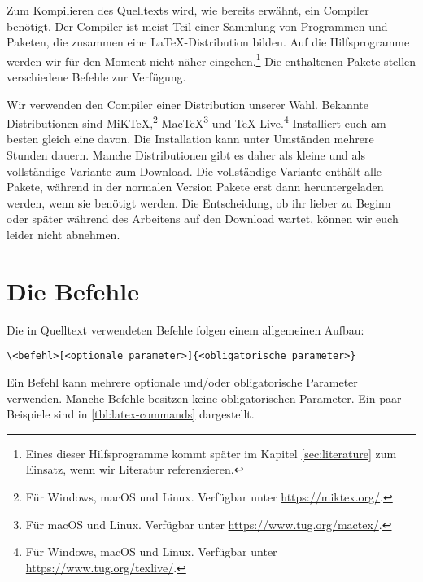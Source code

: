 Zum Kompilieren des Quelltexts wird, wie bereits erwähnt, ein Compiler benötigt.
Der Compiler ist meist Teil einer Sammlung von Programmen und Paketen, die zusammen eine \LaTeX-Distribution bilden. 
Auf die Hilfsprogramme werden wir für den Moment nicht näher eingehen.\footnote{Eines dieser Hilfsprogramme kommt später im Kapitel \ref{sec:literature} zum Einsatz, wenn wir Literatur referenzieren.} Die enthaltenen Pakete stellen verschiedene Befehle zur Verfügung.

Wir verwenden den Compiler einer Distribution unserer Wahl. Bekannte Distributionen sind MiK\TeX,\footnote{Für Windows, macOS und Linux. Verfügbar unter \url{https://miktex.org/}.} Mac\TeX\footnote{Für macOS und Linux. Verfügbar unter \url{https://www.tug.org/mactex/}.} und \TeX{} Live.\footnote{Für Windows, macOS und Linux. Verfügbar unter \url{https://www.tug.org/texlive/}.}
Installiert euch am besten gleich eine davon. Die Installation kann unter Umständen mehrere Stunden dauern. Manche Distributionen gibt es daher als kleine und als vollständige Variante zum Download. 
Die vollständige Variante enthält alle Pakete, während in der normalen Version Pakete erst dann heruntergeladen werden, wenn sie benötigt werden.
Die Entscheidung, ob ihr lieber zu Beginn oder später während des Arbeitens auf den Download wartet, können wir euch leider nicht abnehmen. 

\section{Die Befehle}
\label{subsec:command-structure}
Die in Quelltext verwendeten Befehle folgen einem allgemeinen Aufbau:
\begin{verbatim}
\<befehl>[<optionale_parameter>]{<obligatorische_parameter>}
\end{verbatim}
Ein Befehl kann mehrere optionale und/oder obligatorische Parameter verwenden. Manche Befehle besitzen keine obligatorischen Parameter. Ein paar Beispiele sind in \cref{tbl:latex-commands} dargestellt.

\begin{table}[h!]
	\caption{Beispiele für \LaTeX-Befehle}
	\label{tbl:latex-commands}
\end{table}

